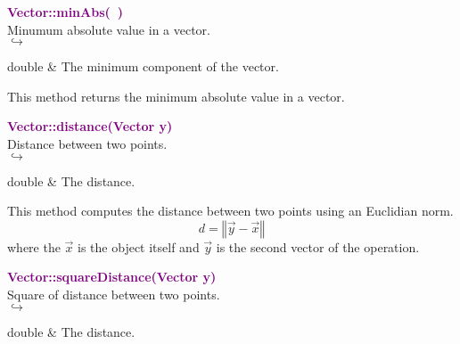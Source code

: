 \textcolor{purple}{\textbf{Vector::minAbs(~)}}\label{Vector::minAbs()}\\
Minumum absolute value in a vector.\\ \hspace*{5mm}$\hookrightarrow$
\vspace*{-2em}\begin{tcolorbox}[grow to left by=-1cm, width=\textwidth-1cm,myArgs,tabularx={l|R}]
double & The minimum component of the vector.
\end{tcolorbox}

This method returns the minimum absolute value in a vector.

\textcolor{purple}{\textbf{Vector::distance(Vector y)}}\label{Vector::distance(Vector y)}\\
Distance between two points.\\ \hspace*{5mm}$\hookrightarrow$
\vspace*{-2em}\begin{tcolorbox}[grow to left by=-1cm, width=\textwidth-1cm,myArgs,tabularx={l|R}]
double & The distance.
\end{tcolorbox}

This method computes the distance between two points using an Euclidian norm.
\begin{equation*}
d = \left\Vert \overrightarrow{y} - \overrightarrow{x} \right\Vert
\end{equation*}
where the $\overrightarrow{x}$ is the object itself and $\overrightarrow{y}$ is the second vector of the operation.

\textcolor{purple}{\textbf{Vector::squareDistance(Vector y)}}\label{Vector::squareDistance(Vector y)}\\
Square of distance between two points.\\ \hspace*{5mm}$\hookrightarrow$
\vspace*{-2em}\begin{tcolorbox}[grow to left by=-1cm, width=\textwidth-1cm,myArgs,tabularx={l|R}]
double & The distance.
\end{tcolorbox}

